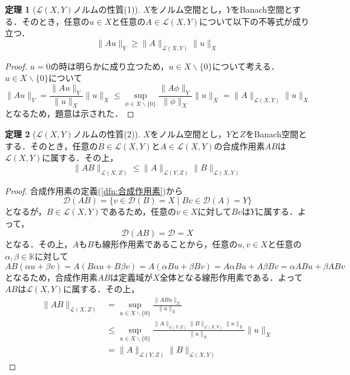 \documentclass[11pt,a4paper,titlepage]{jsreport}
\theoremstyle{definition}
\newtheorem{thm}{定理}
\begin{document}
\begin{thm}[$\mathcal{L}(X,Y)$ノルムの性質(1)]
  $X$をノルム空間とし，$Y$をBanach空間とする．そのとき，任意の$u\in X$と任意の$A\in\mathcal{L}(X,Y)$について以下の不等式が成り立つ．
  \begin{equation*}
    \|Au\|_Y\geq\|A\|_{\mathcal{L}(X,Y)}\|u\|_X
  \end{equation*}
\end{thm}

\begin{proof}
  $u=0$の時は明らかに成り立つため，$u\in X\backslash\{0\}$について考える．$u\in X\backslash\{0\}$について
  \begin{equation*}
    \|Au\|_Y = \frac{\|Au\|_Y}{\|u\|_X}\|u\|_X \leq \sup_{\phi\in X\backslash \{0\}} \frac{\|A\phi\|_Y}{\|\phi\|_X}\|u\|_X = \|A\|_{\mathcal{L}(X,Y)}\|u\|_X
  \end{equation*}
  となるため，題意は示された．
\end{proof}

\begin{thm}[$\mathcal{L}(X,Y)$ノルムの性質(2)]
  \label{thm:ノルムの性質2}
  $X$をノルム空間とし，$Y$と$Z$をBanach空間とする．そのとき，任意の$B\in\mathcal{L}(X,Y)$と$A\in\mathcal{L}(X,Y)$の合成作用素$AB$は$\mathcal{L}(X,Y)$に属する．その上，
  \begin{equation*}
    \|AB\|_{\mathcal{L}(X,Z)} \leq \|A\|_{\mathcal{L}(Y,Z)}\|B\|_{\mathcal{L}(X,Y)}
  \end{equation*}
\end{thm}

\begin{proof}
  合成作用素の定義(\ref{dfn:合成作用素})から
  \begin{equation*}
    \mathcal{D}(AB)=\{v\in\mathcal{D}(B)=X \mid Bv\in\mathcal{D}(A)=Y\}
  \end{equation*}
  となるが，$B\in\mathcal{L}(X,Y)$であるため，任意の$v\in X$に対して$Bv$は$Y$に属する．よって，
  \begin{equation*}
    \mathcal{D}(AB)=\mathcal{D}=X
  \end{equation*}
  となる．その上，$A$も$B$も線形作用素であることから，任意の$u,v\in X$と任意の$\alpha,\beta\in\mathbb{K}$に対して
  \begin{equation*}
    AB(\alpha u+\beta v) = A(B\alpha u+B\beta v) = A(\alpha Bu+\beta Bv) = A\alpha Bu + A\beta Bv = \alpha ABu + \beta ABv
  \end{equation*}
  となるため，合成作用素$AB$は定義域が$X$全体となる線形作用素である．よって$AB$は$\mathcal{L}(X,Y)$に属する．その上，
  \begin{align*}
    \|AB\|_{\mathcal{L}(X,Z)} & = \sup_{u\in X\backslash \{0\}} \frac{\|ABu\|_Z}{\|u\|_X}                                                            \\
                              & \leq \sup_{u\in X\backslash \{0\}} \frac{\|A\|_{\mathcal{L}(Y,Z)} \|B\|_{\mathcal{L}(X,Y)} \|u\|_X }{\|u\|_X}\|u\|_X \\
                              & = \|A\|_{\mathcal{L}(Y,Z)} \|B\|_{\mathcal{L}(X,Y)}
  \end{align*}
\end{proof}
\end{document}

